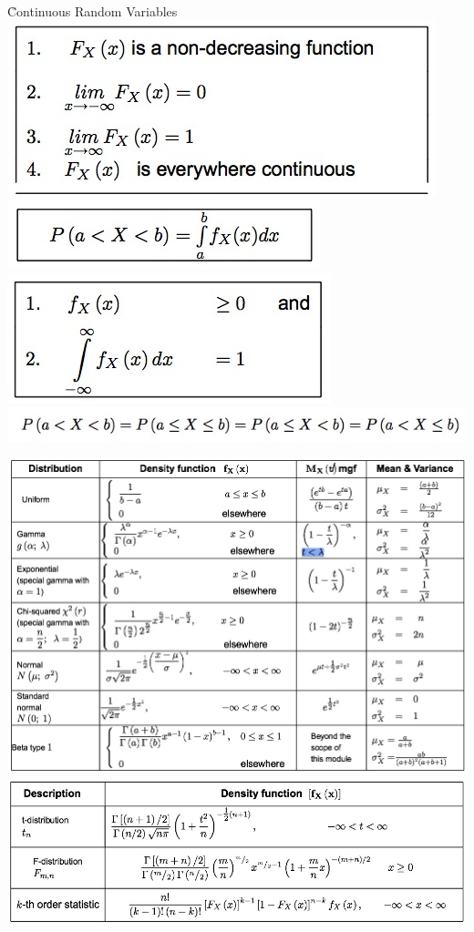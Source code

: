 \documentclass{/out/app/latex/examnotes}
\begin{document}
{\h{Continuous Random Variables}
\includegraphics[scale=0.7]{./img/2con1.jpg}
\includegraphics[scale=0.7]{./img/2con2.jpg}
\includegraphics[scale=0.7]{./img/2con3.jpg}
\includegraphics[scale=0.7]{./img/2con4.jpg}


\includegraphics[scale=0.5]{./img/cont.jpg}
\includegraphics[scale=0.5]{./img/dent.jpg}


}
\end{document}
